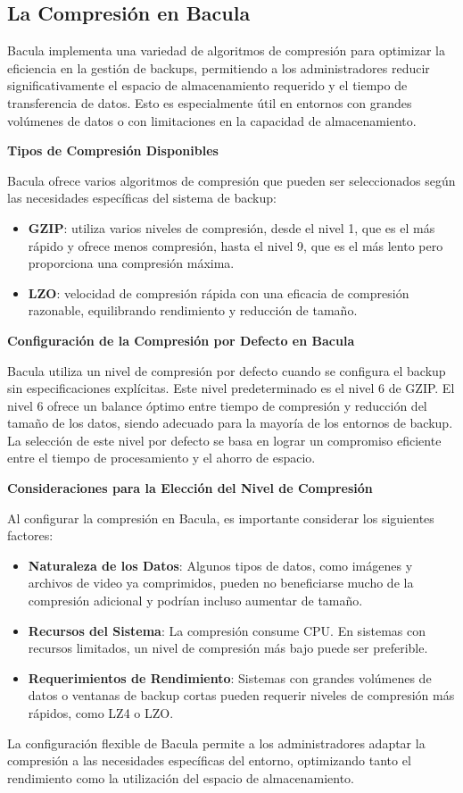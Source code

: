 \subsection{La Compresión en Bacula}

Bacula implementa una variedad de algoritmos de compresión para optimizar la eficiencia en la gestión de backups, permitiendo a los administradores reducir significativamente el espacio de almacenamiento requerido y el tiempo de transferencia de datos. Esto es especialmente útil en entornos con grandes volúmenes de datos o con limitaciones en la capacidad de almacenamiento.

\textbf{Tipos de Compresión Disponibles}\medskip

Bacula ofrece varios algoritmos de compresión que pueden ser seleccionados según las necesidades específicas del sistema de backup:

\begin{itemize}
    \item \textbf{GZIP}: utiliza varios niveles de compresión, desde el nivel 1, que es el más rápido y ofrece menos compresión, hasta el nivel 9, que es el más lento pero proporciona una compresión máxima.
    \item \textbf{LZO}: velocidad de compresión rápida con una eficacia de compresión razonable, equilibrando rendimiento y reducción de tamaño.
\end{itemize}

\textbf{Configuración de la Compresión por Defecto en Bacula}\medskip

Bacula utiliza un nivel de compresión por defecto cuando se configura el backup sin especificaciones explícitas. Este nivel predeterminado es el nivel 6 de GZIP. El nivel 6 ofrece un balance óptimo entre tiempo de compresión y reducción del tamaño de los datos, siendo adecuado para la mayoría de los entornos de backup. La selección de este nivel por defecto se basa en lograr un compromiso eficiente entre el tiempo de procesamiento y el ahorro de espacio.

\textbf{Consideraciones para la Elección del Nivel de Compresión}\medskip

Al configurar la compresión en Bacula, es importante considerar los siguientes factores:

\begin{itemize}
    \item \textbf{Naturaleza de los Datos}: Algunos tipos de datos, como imágenes y archivos de video ya comprimidos, pueden no beneficiarse mucho de la compresión adicional y podrían incluso aumentar de tamaño.
    \item \textbf{Recursos del Sistema}: La compresión consume CPU. En sistemas con recursos limitados, un nivel de compresión más bajo puede ser preferible.
    \item \textbf{Requerimientos de Rendimiento}: Sistemas con grandes volúmenes de datos o ventanas de backup cortas pueden requerir niveles de compresión más rápidos, como LZ4 o LZO.
\end{itemize}

La configuración flexible de Bacula permite a los administradores adaptar la compresión a las necesidades específicas del entorno, optimizando tanto el rendimiento como la utilización del espacio de almacenamiento.
